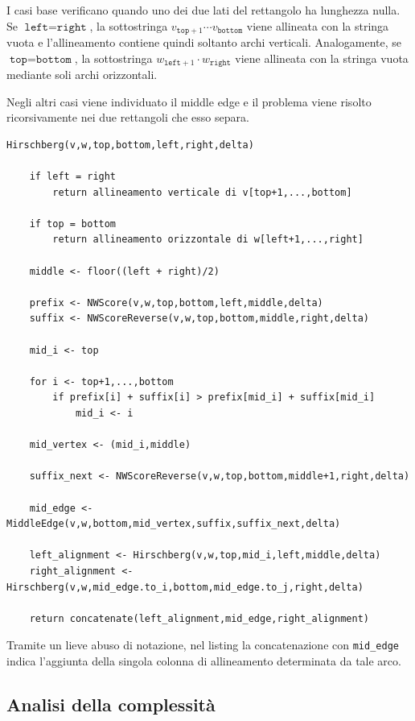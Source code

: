 I casi base verificano quando uno dei due lati del rettangolo ha lunghezza nulla.
Se $\texttt{left}=\texttt{right}$, la sottostringa $v_{\texttt{top}+1}\cdots v_{\texttt{bottom}}$
viene allineata con la stringa vuota e l'allineamento contiene quindi soltanto archi verticali.
Analogamente, se $\texttt{top}=\texttt{bottom}$, la sottostringa $w_{\texttt{left}+1}\cdot w_{\texttt{right}}$
viene allineata con la stringa vuota mediante soli archi orizzontali.

Negli altri casi viene individuato il middle edge e il problema viene risolto ricorsivamente
nei due rettangoli che esso separa.

\begin{lstlisting}[style=pseudo,caption={Algoritmo di Hirschberg}]
Hirschberg(v,w,top,bottom,left,right,delta)
    
    if left = right
        return allineamento verticale di v[top+1,...,bottom]

    if top = bottom
        return allineamento orizzontale di w[left+1,...,right]

    middle <- floor((left + right)/2)

    prefix <- NWScore(v,w,top,bottom,left,middle,delta)
    suffix <- NWScoreReverse(v,w,top,bottom,middle,right,delta)

    mid_i <- top

    for i <- top+1,...,bottom
        if prefix[i] + suffix[i] > prefix[mid_i] + suffix[mid_i]
            mid_i <- i

    mid_vertex <- (mid_i,middle)

    suffix_next <- NWScoreReverse(v,w,top,bottom,middle+1,right,delta)

    mid_edge <- MiddleEdge(v,w,bottom,mid_vertex,suffix,suffix_next,delta)

    left_alignment <- Hirschberg(v,w,top,mid_i,left,middle,delta)
    right_alignment <- Hirschberg(v,w,mid_edge.to_i,bottom,mid_edge.to_j,right,delta)

    return concatenate(left_alignment,mid_edge,right_alignment)
\end{lstlisting}
\label{lst:hirschberg}
Tramite un lieve abuso di notazione, nel listing la concatenazione con \texttt{mid\_edge} indica
l'aggiunta della singola colonna di allineamento determinata da tale arco.

\subsection{Analisi della complessità}

